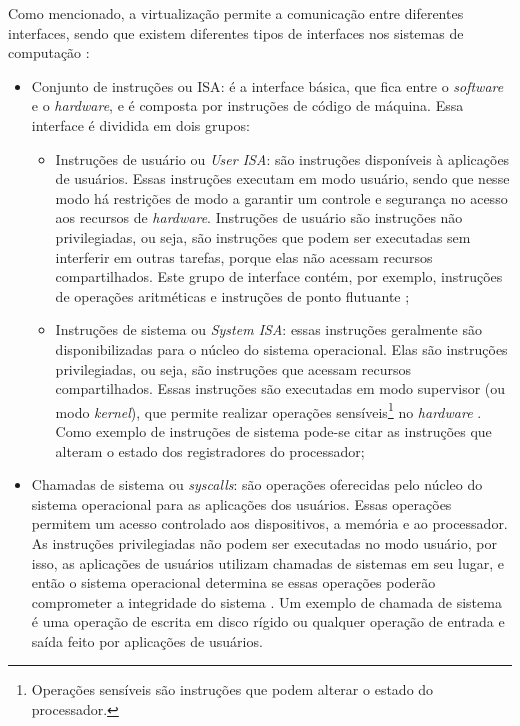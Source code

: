 Como mencionado, a virtualização permite a comunicação entre diferentes interfaces, sendo que existem diferentes tipos de interfaces
nos sistemas de computação \cite{maziero2013}:
\begin{itemize}
 \item Conjunto de instruções ou \ac{ISA}: é a interface básica, que fica entre o \textit{software} e o \textit{hardware}, e é composta por 
 instruções de código de máquina. Essa interface é dividida em dois grupos:
 \begin{itemize}
  \item Instruções de usuário ou \textit{User \ac{ISA}}: são instruções disponíveis à aplicações de usuários. Essas instruções executam em 
  modo usuário, sendo que nesse modo há restrições de modo a garantir um controle e segurança no acesso aos recursos de \textit{hardware}. 
  Instruções de usuário são instruções não privilegiadas, ou seja, são instruções que podem ser executadas sem interferir em outras tarefas, 
  porque elas não acessam recursos compartilhados. Este grupo de interface contém, por exemplo, instruções de operações aritméticas e instruções 
  de ponto flutuante \cite{buyya2013};
  \item Instruções de sistema ou \textit{System \ac{ISA}}: essas instruções geralmente são disponibilizadas para o núcleo do sistema operacional. 
  Elas são instruções privilegiadas, ou seja, são instruções que acessam recursos compartilhados. Essas instruções são executadas em modo 
  supervisor (ou modo \textit{kernel}), que permite realizar operações sensíveis\footnote[1]{Operações sensíveis são instruções que podem alterar o 
  estado do processador.} no \textit{hardware} \cite{buyya2013}. Como exemplo de instruções de sistema pode-se citar as instruções que alteram 
  o estado dos registradores do processador; %
 \end{itemize}
 \item Chamadas de sistema ou \textit{syscalls}: são operações oferecidas pelo núcleo do sistema operacional para as aplicações dos usuários.
 Essas operações permitem um acesso controlado aos dispositivos, a memória e ao processador. 
 As instruções privilegiadas não podem ser executadas no modo usuário, por isso, as aplicações de usuários utilizam chamadas de sistemas em seu 
 lugar, e então o sistema operacional determina se essas operações poderão comprometer a integridade do sistema \cite{marinescu2013}.
 Um exemplo de chamada de sistema é uma operação de escrita em disco rígido ou qualquer operação de entrada e saída feito por aplicações de usuários.
\end{itemize}

